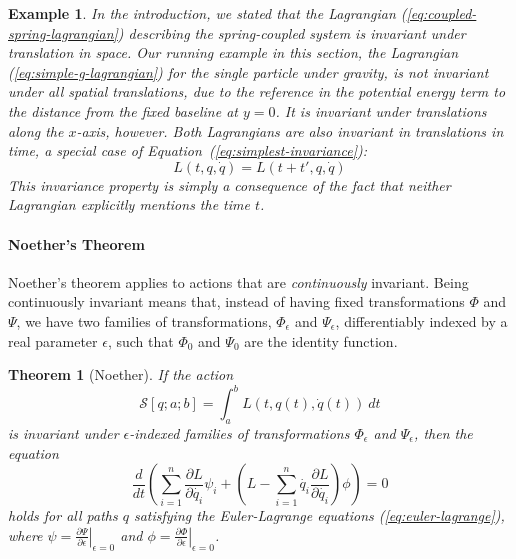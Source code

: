 \documentclass[preprint]{sigplanconf}
\newtheorem{theorem}{Theorem}
\theoremstyle{examplestyle}
\newtheorem{example}{Example}
\begin{document}
\begin{example}\label{ex:invariance-examples}
  In the introduction, we stated that the Lagrangian
  (\ref{eq:coupled-spring-lagrangian}) describing the spring-coupled
  system is invariant under translation in space. Our running example
  in this section, the Lagrangian (\ref{eq:simple-g-lagrangian}) for
  the single particle under gravity, is not invariant under all
  spatial translations, due to the reference in the potential energy
  term to the distance from the fixed baseline at $y = 0$. It is
  invariant under translations along the $x$-axis, however. Both
  Lagrangians are also invariant in translations in time, a special
  case of Equation~(\ref{eq:simplest-invariance}):
  \begin{displaymath}
    L(t,q,\dot{q}) = L(t+t',q,\dot{q})
  \end{displaymath}
  This invariance property is simply a consequence of the fact that
  neither Lagrangian explicitly mentions the time $t$.
\end{example}

\paragraph{Noether's Theorem} Noether's theorem applies to actions
that are \emph{continuously} invariant. Being continuously invariant
means that, instead of having fixed transformations $\Phi$ and $\Psi$,
we have two families of transformations, $\Phi_\epsilon$ and
$\Psi_\epsilon$, differentiably indexed by a real parameter
$\epsilon$, such that $\Phi_0$ and $\Psi_0$ are the identity function.

\begin{theorem}[Noether]
  If the action
  \begin{displaymath}
    \mathcal{S}[q;a;b] = \int_a^b L(t,q(t),\dot{q}(t))~dt
  \end{displaymath}
  is invariant under $\epsilon$-indexed families of transformations
  $\Phi_\epsilon$ and $\Psi_\epsilon$, then the equation
  \begin{equation}
    \label{eq:conservation-law}
    \frac{d}{dt}\left(\sum_{i=1}^n \frac{\partial L}{\partial \dot{q_i}}\psi_i + \left(L - \sum_{i=1}^n \dot{q_i}\frac{\partial L}{\partial \dot{q_i}}\right) \phi \right) = 0
  \end{equation}
  holds for all paths $q$ satisfying the Euler-Lagrange equations
  (\ref{eq:euler-lagrange}), where $\psi = \left. \frac{\partial
      \Psi}{\partial \epsilon} \right|_{\epsilon = 0}$ and $\phi =
  \left. \frac{\partial \Phi}{\partial \epsilon} \right|_{\epsilon =
    0}$.
\end{theorem}
\end{document}
